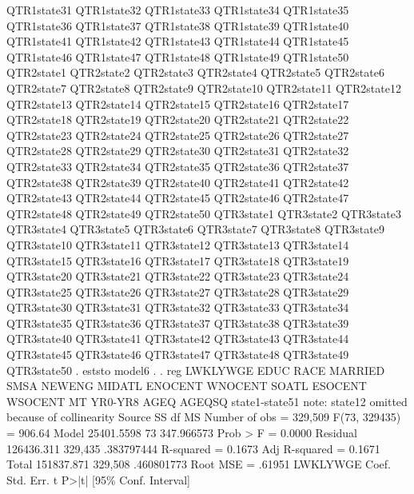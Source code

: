                QTR1state31 QTR1state32 QTR1state33 QTR1state34 QTR1state35
               QTR1state36 QTR1state37 QTR1state38 QTR1state39 QTR1state40
               QTR1state41 QTR1state42 QTR1state43 QTR1state44 QTR1state45
               QTR1state46 QTR1state47 QTR1state48 QTR1state49 QTR1state50
               QTR2state1 QTR2state2 QTR2state3 QTR2state4 QTR2state5
               QTR2state6 QTR2state7 QTR2state8 QTR2state9 QTR2state10
               QTR2state11 QTR2state12 QTR2state13 QTR2state14 QTR2state15
               QTR2state16 QTR2state17 QTR2state18 QTR2state19 QTR2state20
               QTR2state21 QTR2state22 QTR2state23 QTR2state24 QTR2state25
               QTR2state26 QTR2state27 QTR2state28 QTR2state29 QTR2state30
               QTR2state31 QTR2state32 QTR2state33 QTR2state34 QTR2state35
               QTR2state36 QTR2state37 QTR2state38 QTR2state39 QTR2state40
               QTR2state41 QTR2state42 QTR2state43 QTR2state44 QTR2state45
               QTR2state46 QTR2state47 QTR2state48 QTR2state49 QTR2state50
               QTR3state1 QTR3state2 QTR3state3 QTR3state4 QTR3state5
               QTR3state6 QTR3state7 QTR3state8 QTR3state9 QTR3state10
               QTR3state11 QTR3state12 QTR3state13 QTR3state14 QTR3state15
               QTR3state16 QTR3state17 QTR3state18 QTR3state19 QTR3state20
               QTR3state21 QTR3state22 QTR3state23 QTR3state24 QTR3state25
               QTR3state26 QTR3state27 QTR3state28 QTR3state29 QTR3state30
               QTR3state31 QTR3state32 QTR3state33 QTR3state34 QTR3state35
               QTR3state36 QTR3state37 QTR3state38 QTR3state39 QTR3state40
               QTR3state41 QTR3state42 QTR3state43 QTR3state44 QTR3state45
               QTR3state46 QTR3state47 QTR3state48 QTR3state49 QTR3state50
{\smallskip}
. eststo model6
{\smallskip}
. 
. reg  LWKLYWGE EDUC  RACE MARRIED SMSA NEWENG MIDATL ENOCENT WNOCENT SOATL ESOCENT WSOCENT MT YR0-YR8 AGEQ AGEQSQ state1-state51
note: state12 omitted because of collinearity
{\smallskip}
      Source {\VBAR}       SS           df       MS      Number of obs   =   329,509
   F(73, 329435)   =    906.64
       Model {\VBAR}  25401.5598        73  347.966573   Prob > F        =    0.0000
    Residual {\VBAR}  126436.311   329,435  .383797444   R-squared       =    0.1673
   Adj R-squared   =    0.1671
       Total {\VBAR}  151837.871   329,508  .460801773   Root MSE        =    .61951
{\smallskip}
    LWKLYWGE {\VBAR}      Coef.   Std. Err.      t    P>|t|     [95\% Conf. Interval]
